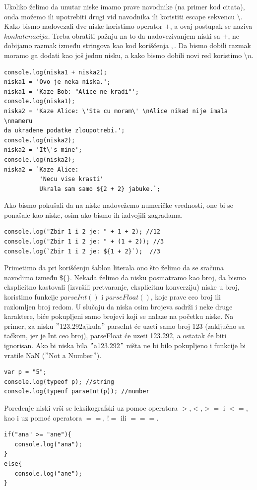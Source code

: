 \documentclass[a4paper]{article}
\begin{document}
Ukoliko želimo da unutar niske imamo prave navodnike (na primer kod citata), onda možemo ili upotrebiti drugi vid navodnika ili koristiti escape sekvencu \textbackslash. Kako bismo nadovezali dve niske koristimo operator $+$, a ovaj postupak se naziva $konkatenacija$. Treba obratiti pažnju na to da nadovezivanjem niski sa $+$, ne dobijamo razmak između stringova kao kod korišćenja $,$. Da bismo dobili razmak moramo ga dodati kao još jednu nisku, a kako bismo dobili novi red koristimo \textbackslash$n$. 
\begin{lstlisting}[backgroundcolor = \color{lightgray}]
console.log(niska1 + niska2); 
niska1 = 'Ovo je neka niska.';
niska1 = 'Kaze Bob: "Alice ne kradi"';
console.log(niska1);
niska2 = 'Kaze Alice: \'Sta cu moram\' \nAlice nikad nije imala \nnameru
da ukradene podatke zloupotrebi.';
console.log(niska2); 
niska2 = 'It\'s mine';
console.log(niska2);
niska2 = `Kaze Alice:
          'Necu vise krasti'
          Ukrala sam samo ${2 + 2} jabuke.`;
\end{lstlisting}
Ako bismo pokušali da na niske nadovežemo numeričke vrednosti, one bi se ponašale kao niske, osim ako bismo ih izdvojili zagradama.
\begin{lstlisting}[backgroundcolor = \color{lightgray}]
console.log("Zbir 1 i 2 je: " + 1 + 2); //12
console.log("Zbir 1 i 2 je: " + (1 + 2)); //3
console.log(`Zbir 1 i 2 je: ${1 + 2}`);  //3
\end{lstlisting}
Primetimo da pri korišćenju šablon literala ono što želimo da se sračuna navodimo između $\$\{\}$.
Nekada želimo da nisku posmatramo kao broj, da bismo eksplicitno kastovali (izvršili pretvaranje, eksplicitnu konverziju) niske u broj, koristimo funkcije $parseInt()$ i $parseFloat()$, koje prave ceo broj ili razlomljen broj redom. U slučaju da niska osim brojeva sadrži i neke druge karaktere, biće pokupljeni samo brojevi koji se nalaze na početku niske. Na primer, za nisku $"$123.292ajkula$"$ parseInt će uzeti samo broj 123 (zaključno sa tačkom, jer je Int ceo broj), parseFloat će uzeti 123.292, a ostatak će biti ignorisan. Ako bi niska bila $"$a123.292$"$ ništa ne bi bilo pokupljeno i funkcije bi vratile NaN ($"$Not a Number$"$). 
\begin{lstlisting}[backgroundcolor = \color{lightgray}]
var p = "5";
console.log(typeof p); //string
console.log(typeof parseInt(p)); //number
\end{lstlisting}
Poređenje niski vrši se leksikografski uz pomoc operatora $>$,$<$,$>=$ i $<=$, kao i uz pomoć operatora $==$, $!=$ ili $===$.
\begin{lstlisting}[backgroundcolor = \color{lightgray}]
if("ana" >= "ane"){
   console.log("ana");
}
else{
   console.log("ane");
}
\end{lstlisting}
\end{document}
